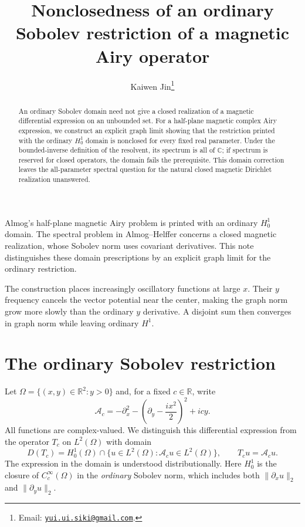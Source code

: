 \documentclass[11pt,a4paper]{article}
\title{Nonclosedness of an ordinary Sobolev restriction
of a magnetic Airy operator}
\author{Kaiwen Jin\thanks{Email: \href{mailto:yui.ui.siki@gmail.com}{\texttt{yui.ui.siki@gmail.com}}.}}
\date{}
\begin{document}
\maketitle
\begin{abstract}
An ordinary Sobolev domain need not give a closed realization of a magnetic
differential expression on an unbounded set. For a half-plane magnetic
complex Airy expression, we construct an explicit graph limit showing that
the restriction printed with the ordinary $H^1_0$ domain is nonclosed for
every fixed real parameter. Under the bounded-inverse definition of the
resolvent, its spectrum is all of $\mathbb C$; if spectrum is reserved for
closed operators, the domain fails the prerequisite. This domain correction
leaves the all-parameter spectral question for the natural closed magnetic
Dirichlet realization unanswered.
\end{abstract}

Almog's half-plane magnetic Airy problem \cite{Almog2015} is printed with an
ordinary $H^1_0$ domain. The spectral problem in Almog--Helffer
\cite[pp.~1--2 and~6]{AlmogHelffer} concerns a closed magnetic realization, whose
Sobolev norm uses covariant derivatives. This note distinguishes these domain
prescriptions by an explicit graph limit for the ordinary restriction.

The construction places increasingly oscillatory functions at large $x$.
Their $y$ frequency cancels the vector potential near the center, making
the graph norm grow more slowly than the ordinary $y$ derivative.
A disjoint sum then converges in graph norm while leaving ordinary $H^1$.

\section{The ordinary Sobolev restriction}
\label{sec:operator}

Let $\Omega=\{(x,y)\in\mathbb R^2:y>0\}$ and, for a fixed $c\in\mathbb R$, write
\begin{equation}
 \mathcal A_c=-\partial_x^2-\left(\partial_y-\frac{ix^2}{2}\right)^2+icy.
 \label{eq:expression}
\end{equation}
All functions are complex-valued. We distinguish this differential expression
from the operator $T_c$ on $L^2(\Omega)$ with domain
\begin{equation}
 D(T_c)=H^1_0(\Omega)\cap
 \{u\in L^2(\Omega):\mathcal A_cu\in L^2(\Omega)\},
 \qquad T_cu=\mathcal A_cu.
 \label{eq:domain}
\end{equation}
The expression in the domain is understood distributionally. Here $H^1_0$
is the closure of $C_c^\infty(\Omega)$ in the \emph{ordinary} Sobolev norm,
which includes both $\|\partial_xu\|_2$ and $\|\partial_yu\|_2$.
\end{document}
